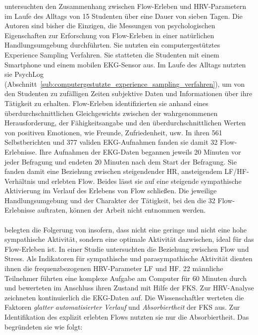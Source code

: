 untersuchten den Zusammenhang zwischen Flow-Erleben und \ac{HRV}-Parametern im Laufe des Alltags von 15 Studenten über eine Dauer von sieben Tagen. Die Autoren sind bisher die Einzigen, die Messungen von psychologischen Eigenschaften zur Erforschung von Flow-Erleben in einer natürlichen Handlungsumgebung durchführten. Sie nutzten ein computergestütztes Experience Sampling Verfahren. Sie statteten die Studenten mit einem Smartphone und einem mobilen \ac{EKG}-Sensor aus. Im Laufe des Alltags nutzten sie PsychLog (Abschnitt~\ref{sub:computergestutzte_experience_sampling_verfahren}), um von den Studenten zu zufälligen Zeiten subjektive Daten und Informationen über ihre Tätigkeit zu erhalten. Flow-Erleben identifizierten sie anhand eines überdurchschnittlichen Gleichgewichts zwischen der wahrgenommenen Herausforderung, der Fähigkeitsangabe und den überdurchschnittlichen Werten von positiven Emotionen, wie Freunde, Zufriedenheit, usw. In ihren 561 Selbstberichten und 377 validen \ac{EKG}-Aufnahmen fanden sie damit 32 Flow-Erlebnisse. Ihre Aufnahmen der \ac{EKG}-Daten begannen jeweils 20 Minuten vor jeder Befragung und endeten 20 Minuten nach dem Start der Befragung. Sie fanden damit eine Beziehung zwischen steigendender \ac{HR}, ansteigendem \acs{LF}/\acs{HF}-Verhältnis und erlebten Flow. Beides lässt sie auf eine steigende sympathische Aktivierung im Verlauf des Erlebens von Flow schließen. Die jeweilige Handlungsumgebung und der Charakter der Tätigkeit, bei den die 32 Flow-Erlebnisse auftraten, können der Arbeit nicht entnommen werden. 

\paragraph{\citet{Peifer2014}} 

\label{par:peifer2014}

belegten die Folgerung von \citet{deManzano2010, Peifer2012} insofern, dass nicht eine geringe und nicht eine hohe sympathische Aktivität, sondern eine optimale Aktivität dazwischen, ideal für das Flow-Erleben ist. In einer Studie untersuchten \citet{Peifer2014} die Beziehung zwischen Flow und Stress. Als Indikatoren für sympathische und parasympathische Aktivität dienten ihnen die frequenzbezogenen \ac{HRV}-Parameter \acs{LF} und \acs{HF}. 22 männliche Teilnehmer führten eine komplexe Aufgabe am Computer für 60 Minuten durch und bewerteten im Anschluss ihren Zustand mit Hilfe der \ac{FKS}. Zur \ac{HRV}-Analyse zeichneten \citet{Peifer2014} kontinuierlich die \ac{EKG}-Daten auf. Die Wissenschaftler werteten die Faktoren \emph{glatter automatisierter Verlauf} und \emph{Absorbiertheit} der \ac{FKS} aus. Zur Identifikation des explizit erlebten Flows nutzten sie nur die Absorbiertheit. Das begründeten sie wie folgt:

